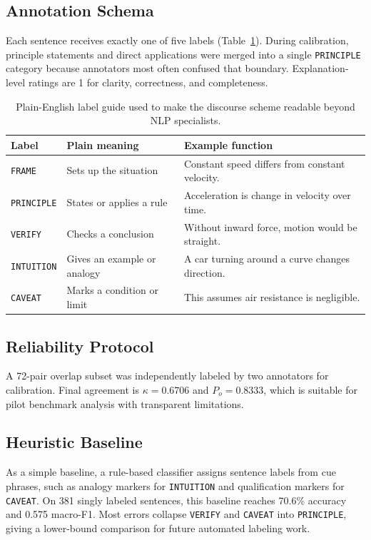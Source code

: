 \documentclass{article}
\begin{document}
\subsection{Annotation Schema}
Each sentence receives exactly one of five labels (Table~\ref{tab:labels}). During calibration, principle statements and direct applications were merged into a single \texttt{PRINCIPLE} category because annotators most often confused that boundary. Explanation-level ratings are 1 for clarity, correctness, and completeness.

\begin{table}[t]
\centering
\scriptsize
\begin{tabular}{lll}
\toprule
Label & Plain meaning & Example function \\
\midrule
\texttt{FRAME} & Sets up the situation & Constant speed differs from constant velocity. \\
\texttt{PRINCIPLE} & States or applies a rule & Acceleration is change in velocity over time. \\
\texttt{VERIFY} & Checks a conclusion & Without inward force, motion would be straight. \\
\texttt{INTUITION} & Gives an example or analogy & A car turning around a curve changes direction. \\
\texttt{CAVEAT} & Marks a condition or limit & This assumes air resistance is negligible. \\
\bottomrule
\end{tabular}
\caption{Plain-English label guide used to make the discourse scheme readable beyond NLP specialists.}
\label{tab:labels}
\vspace{-0.8em}
\end{table}

\subsection{Reliability Protocol}
A 72-pair overlap subset was independently labeled by two annotators for calibration. Final agreement is $\kappa=0.6706$ and $P_o=0.8333$, which is suitable for pilot benchmark analysis with transparent limitations.

\subsection{Heuristic Baseline}
As a simple baseline, a rule-based classifier assigns sentence labels from cue phrases, such as analogy markers for \texttt{INTUITION} and qualification markers for \texttt{CAVEAT}. On 381 singly labeled sentences, this baseline reaches 70.6\% accuracy and 0.575 macro-F1. Most errors collapse \texttt{VERIFY} and \texttt{CAVEAT} into \texttt{PRINCIPLE}, giving a lower-bound comparison for future automated labeling work.
\end{document}
